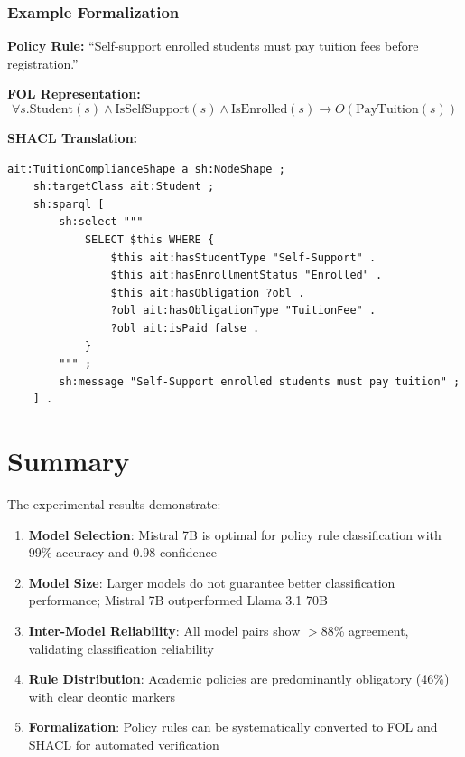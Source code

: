 \subsubsection{Example Formalization}

\textbf{Policy Rule:} ``Self-support enrolled students must pay tuition fees before registration.''

\textbf{FOL Representation:}
\[
\forall s. \text{Student}(s) \land \text{IsSelfSupport}(s) \land \text{IsEnrolled}(s) \rightarrow O(\text{PayTuition}(s))
\]

\textbf{SHACL Translation:}
\begin{lstlisting}[language=Turtle]
ait:TuitionComplianceShape a sh:NodeShape ;
    sh:targetClass ait:Student ;
    sh:sparql [
        sh:select """
            SELECT $this WHERE {
                $this ait:hasStudentType "Self-Support" .
                $this ait:hasEnrollmentStatus "Enrolled" .
                $this ait:hasObligation ?obl .
                ?obl ait:hasObligationType "TuitionFee" .
                ?obl ait:isPaid false .
            }
        """ ;
        sh:message "Self-Support enrolled students must pay tuition" ;
    ] .
\end{lstlisting}

\section{Summary}

The experimental results demonstrate:

\begin{enumerate}
    \item \textbf{Model Selection}: Mistral 7B is optimal for policy rule classification with 99\% accuracy and 0.98 confidence
    \item \textbf{Model Size}: Larger models do not guarantee better classification performance; Mistral 7B outperformed Llama 3.1 70B
    \item \textbf{Inter-Model Reliability}: All model pairs show $>$88\% agreement, validating classification reliability
    \item \textbf{Rule Distribution}: Academic policies are predominantly obligatory (46\%) with clear deontic markers
    \item \textbf{Formalization}: Policy rules can be systematically converted to FOL and SHACL for automated verification
\end{enumerate}
